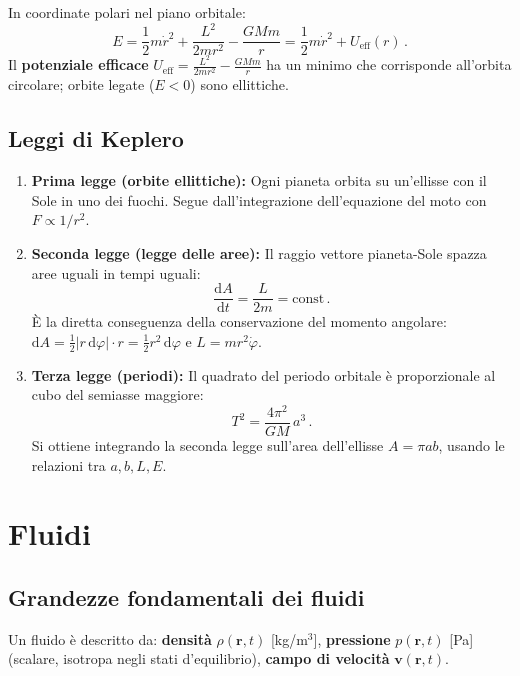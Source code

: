 \documentclass[11pt,a4paper]{article}
\renewcommand{\vec}[1]{\bm{#1}}
\theoremstyle{plain}
\theoremstyle{definition}
\theoremstyle{remark}
\begin{document}
In coordinate polari nel piano orbitale:
\[
  E=\frac{1}{2}m\dot r^2+\frac{L^2}{2mr^2}-\frac{GMm}{r}
   =\frac{1}{2}m\dot r^2+U_\mathrm{eff}(r)\,.
\]
Il \textbf{potenziale efficace} $U_\mathrm{eff}=\frac{L^2}{2mr^2}-\frac{GMm}{r}$
ha un minimo che corrisponde all'orbita circolare; orbite legate ($E<0$)
sono ellittiche.

\subsection{Leggi di Keplero}

\begin{enumerate}
  \item \textbf{Prima legge (orbite ellittiche):} Ogni pianeta orbita su
    un'ellisse con il Sole in uno dei fuochi. Segue dall'integrazione
    dell'equazione del moto con $F\propto1/r^2$.

  \item \textbf{Seconda legge (legge delle aree):} Il raggio vettore
    pianeta-Sole spazza aree uguali in tempi uguali:
    \[
      \frac{\mathrm{d}A}{\mathrm{d}t}=\frac{L}{2m}=\mathrm{const}\,.
    \]
    È la diretta conseguenza della conservazione del momento angolare:
    $\mathrm{d}A=\tfrac{1}{2}|r\,\mathrm{d}\varphi|\cdot r=\tfrac{1}{2}r^2\,\mathrm{d}\varphi$
    e $L=mr^2\dot\varphi$.

  \item \textbf{Terza legge (periodi):} Il quadrato del periodo orbitale è
    proporzionale al cubo del semiasse maggiore:
    \[
      T^2=\frac{4\pi^2}{GM}\,a^3\,.
    \]
    Si ottiene integrando la seconda legge sull'area dell'ellisse
    $A=\pi ab$, usando le relazioni tra $a,b,L,E$.
\end{enumerate}

\section{Fluidi}

\subsection{Grandezze fondamentali dei fluidi}

Un fluido è descritto da: \textbf{densità} $\rho(\vec{r},t)$ [kg/m$^3$],
\textbf{pressione} $p(\vec{r},t)$ [Pa] (scalare, isotropa negli stati
d'equilibrio), \textbf{campo di velocità} $\vec{v}(\vec{r},t)$.
\end{document}
